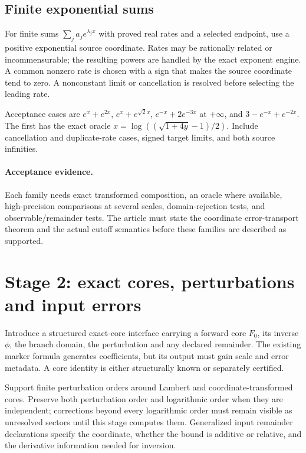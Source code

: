 \documentclass[11pt,a4paper]{article}
\begin{document}
\subsection{Finite exponential sums}

For finite sums $\sum_j a_j e^{\lambda_j x}$ with proved real rates and a selected endpoint, use a positive exponential source coordinate. Rates may be rationally related or incommensurable; the resulting powers are handled by the exact exponent engine. A common nonzero rate is chosen with a sign that makes the source coordinate tend to zero. A nonconstant limit or cancellation is resolved before selecting the leading rate.

Acceptance cases are $e^x+e^{2x}$, $e^x+e^{\sqrt2 x}$, $e^{-x}+2e^{-3x}$ at $+\infty$, and $3-e^{-x}+e^{-2x}$. The first has the exact oracle $x=\log((\sqrt{1+4y}-1)/2)$. Include cancellation and duplicate-rate cases, signed target limits, and both source infinities.

\paragraph{Acceptance evidence.} Each family needs exact transformed composition, an oracle where available, high-precision comparisons at several scales, domain-rejection tests, and observable/remainder tests. The article must state the coordinate error-transport theorem and the actual cutoff semantics before these families are described as supported.

\section{Stage 2: exact cores, perturbations and input errors}

Introduce a structured exact-core interface carrying a forward core $F_0$, its inverse $\phi$, the branch domain, the perturbation and any declared remainder. The existing marker formula generates coefficients, but its output must gain scale and error metadata. A core identity is either structurally known or separately certified.

Support finite perturbation orders around Lambert and coordinate-transformed cores. Preserve both perturbation order and logarithmic order when they are independent; corrections beyond every logarithmic order must remain visible as unresolved sectors until this stage computes them. Generalized input remainder declarations specify the coordinate, whether the bound is additive or relative, and the derivative information needed for inversion.
\end{document}
